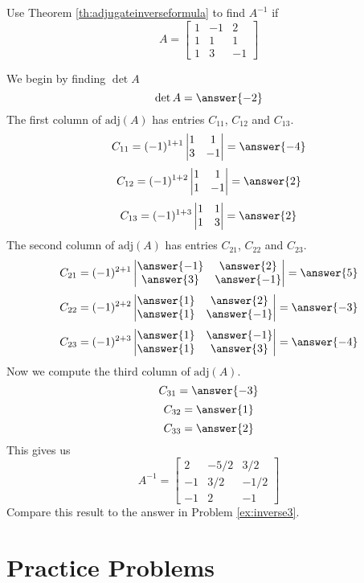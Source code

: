 \documentclass{ximera}
\begin{document}
\begin{example}\label{ex:inversebyadjugate}
Use Theorem \ref{th:adjugateinverseformula} to  find $A^{-1}$ if
$$A=\begin{bmatrix}1&-1&2\\1&1&1\\1&3&-1\end{bmatrix}$$
\begin{explanation}
We begin by finding $\det{A}$
$$\det{A}=\answer{-2}$$
The first column of $\mbox{adj}(A)$ has entries $C_{11}$, $C_{12}$ and $C_{13}$.
$$C_{11}=(-1)^{1+1}\begin{vmatrix}1&1\\3&-1\end{vmatrix}=\answer{-4}$$
$$C_{12}=(-1)^{1+2}\begin{vmatrix}1&1\\1&-1\end{vmatrix}=\answer{2}$$
$$C_{13}=(-1)^{1+3}\begin{vmatrix}1&1\\1&3\end{vmatrix}=\answer{2}$$
The second column of $\mbox{adj}(A)$ has entries $C_{21}$, $C_{22}$ and $C_{23}$.
$$C_{21}=(-1)^{2+1}\begin{vmatrix}\answer{-1}&\answer{2}\\\answer{3}&\answer{-1}\end{vmatrix}=\answer{5}$$
$$C_{22}=(-1)^{2+2}\begin{vmatrix}\answer{1}&\answer{2}\\\answer{1}&\answer{-1}\end{vmatrix}=\answer{-3}$$
$$C_{23}=(-1)^{2+3}\begin{vmatrix}\answer{1}&\answer{-1}\\\answer{1}&\answer{3}\end{vmatrix}=\answer{-4}$$
Now we compute the third column of $\mbox{adj}(A)$.
$$C_{31}=\answer{-3}$$
$$C_{32}=\answer{1}$$
$$C_{33}=\answer{2}$$
This gives us
$$A^{-1}=\begin{bmatrix}2&-5/2&3/2\\-1&3/2&-1/2\\-1&2&-1\end{bmatrix}$$
Compare this result to the answer in Problem \ref{ex:inverse3}.
 
\end{explanation}
\end{example}
 
\section*{Practice Problems}
 
\end{document}
